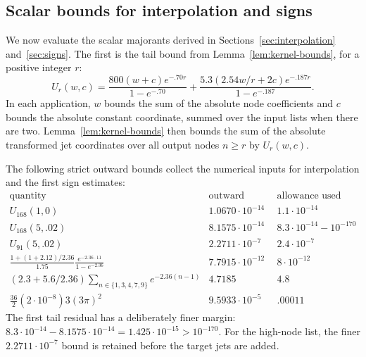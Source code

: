 \subsection{Scalar bounds for interpolation and signs}

We now evaluate the scalar majorants derived in
Sections~\ref{sec:interpolation} and~\ref{sec:signs}.  The first is the tail
bound from Lemma~\ref{lem:kernel-bounds}, for a positive integer $r$:
\[
 U_r(w,c)=
 \frac{800(w+c)e^{-.70r}}{1-e^{-.70}}
 +\frac{5.3(2.54w/r+2c)e^{-.187r}}{1-e^{-.187}}.
\]
In each application, $w$ bounds the sum of the absolute node coefficients
and $c$ bounds the absolute constant coordinate, summed over the input lists
when there are two.  Lemma~\ref{lem:kernel-bounds} then bounds the sum of
the absolute transformed jet coordinates over all output nodes $n\ge r$
by $U_r(w,c)$.

The following strict outward bounds collect the numerical inputs for
interpolation and the first sign estimates:
\begin{equation}\label{eq:scalar-error-budgets}
\begin{array}{c|c|c}
\text{quantity}&\text{outward upper bound}&\text{allowance used}\\ \hline
 U_{168}(1,0)&1.0670\cdot10^{-14}&1.1\cdot10^{-14}\\
 U_{168}(5,.02)&8.1575\cdot10^{-14}&8.3\cdot10^{-14}-10^{-170}\\
 U_{91}(5,.02)&2.2711\cdot10^{-7}&2.4\cdot10^{-7}\\
 \displaystyle\frac{1+(1+2.12)/2.36}{1.75}
       \frac{e^{-2.36\cdot11}}{1-e^{-2.36}}
       &7.7915\cdot10^{-12}&8\cdot10^{-12}\\[2pt]
 \displaystyle(2.3+5.6/2.36)
       \sum_{n\in\{1,3,4,7,9\}}e^{-2.36(n-1)}
       &4.7185&4.8\\[2pt]
 \displaystyle\frac{36}{2}(2\cdot10^{-8})3(3\pi)^2
       &9.5933\cdot10^{-5}&.00011
\end{array}
\end{equation}
The first tail residual has a deliberately finer margin:
$8.3\cdot10^{-14}-8.1575\cdot10^{-14}
=1.425\cdot10^{-15}>10^{-170}$.  For the high-node list, the finer
$2.2711\cdot10^{-7}$ bound is retained before the target jets are added.

